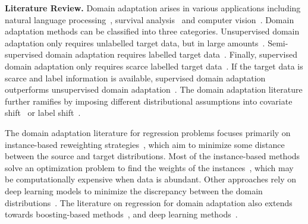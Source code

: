 \documentclass{article}
\begin{document}
\textbf{Literature Review.}
 Domain adaptation arises in various applications including natural language processing~\citep{ref:sogaard2013semi, ref:li2012literature, ref:jiang-zhai-2007-instance, ref:blitzer2006domain}, survival analysis~\citep{ref:li2016transfer} and computer vision~\citep{ref:WANG2018135, Csurka2017}.
 Domain adaptation methods can be classified into three categories. 
 Unsupervised domain adaptation only requires unlabelled target data, but in large amounts~\citep{ref:ghifary2016deep, ref:baktashmotlagh2013unsupervised, ref:ganin2015unsupervised, ref:wang2020distributionally, ref:long2016unsupervised, ref:ben2007analysis, ref:courty2016optimal}. Semi-supervised domain adaptation requires labelled target data~\citep{ref:yao2015semi, ref:kumar2010co, ref:sindhwani2005co, ref:lopez2013semi,  ref:avishek2011active, ref:de2020adversarial, ref:sun2011two}.
 Finally, supervised domain adaptation only requires scarce labelled target data~\cite{ref:motiian2017unified, ref:motiian2017few, ref:tzeng2015simultaneous, ref:koniusz2017domain}.
 If the target data is scarce and label information is available, supervised domain adaptation outperforms unsupervised domain adaptation~\citep{ref:motiian2017unified}. 
 The domain adaptation literature further ramifies by imposing different distributional assumptions into covariate shift~\citep{ref:shimodaira2000improving, ref:sugiyama2008direct} or label shift~\citep{ref:lipton2018detecting, ref:azizzadenesheli2018regularized}.

 The domain adaptation literature for regression problems focuses primarily on instance-based reweighting strategies~\citep{ref:garcke2014importance, ref:sugiyama2008direct, ref:garcke2014importance, ref:huang2006correcting, ref:CORTES2014domain, ref:chen2016robust}, which aim to minimize some distance between the source and target distributions.
 Most of the instance-based methods solve an optimization problem to find the weights of the instances~\citep{ref:garcke2014importance, ref:cortes2019adaptation}, which may be computationally expensive when data is abundant.
 Other approaches rely on deep learning models to minimize the discrepancy between the domain distributions~\citep{ref:zhao2018adversarial, ref:richard2020unsupervised}.
 The literature on regression for domain adaptation also extends towards boosting-based methods~\citep{ref:Pardoe2010BoostingFR}, and 
 deep learning methods~\citep{ref:SALAKEN2019565}.
    
\end{document}
